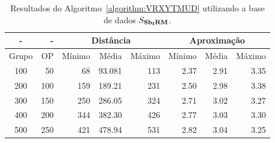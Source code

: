 \begin{table}[!htb]
  \caption{Resultados do Algoritmo~\ref{algorithm:VRXYTMUD} utilizando a base de dados $S_{\textbf{Sb\textsubscript{I}RM}}{}$.}
  \label{table:HZHMCLUM}
  \centering
  \begin{tabular}{|c|r|r|r|r|r|r|r|}
    \hline
      -      &  -   & \multicolumn{3}{c|}{Distância}             & \multicolumn{3}{c|}{Aproximação}           \\ \hline
    Grupo    & OP   & Mínimo       & Média        & Máximo       & Mínimo       & Média        & Máximo       \\ \hline  
    100      & 50   & 68           & 93.081       & 113          & 2.37         & 2.91         & 3.35         \\ \hline
    200      & 100  & 159          & 189.21       & 231          & 2.50         & 2.98         & 3.38         \\ \hline
    300      & 150  & 250          & 286.05       & 324          & 2.71         & 3.02         & 3.27         \\ \hline
    400      & 200  & 344          & 382.30       & 426          & 2.77         & 3.03         & 3.30         \\ \hline
    500      & 250  & 421          & 478.94       & 531          & 2.82         & 3.04         & 3.25         \\ \hline    
  \end{tabular}
\end{table}